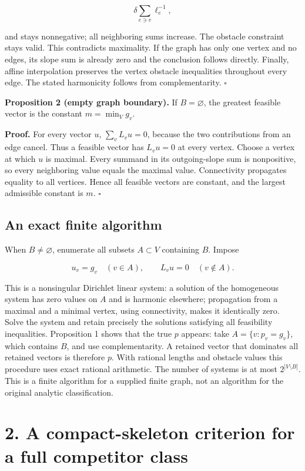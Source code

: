 \documentclass[
  11pt,
]{article}
\begin{document}
\[\delta\sum_{e\ni v}\ell_e^{-1},\]

and stays nonnegative; all neighboring sums increase. The obstacle
constraint stays valid. This contradicts maximality. If the graph has
only one vertex and no edges, its slope sum is already zero and the
conclusion follows directly. Finally, affine interpolation preserves the
vertex obstacle inequalities throughout every edge. The stated
harmonicity follows from complementarity. \(\square\)

\textbf{Proposition 2 (empty graph boundary).} If \(B=\varnothing\), the
greatest feasible vector is the constant \(m=\min_Vg_v\).

\textbf{Proof.} For every vector \(u\), \(\sum_vL_vu=0\), because the
two contributions from an edge cancel. Thus a feasible vector has
\(L_vu=0\) at every vertex. Choose a vertex at which \(u\) is maximal.
Every summand in its outgoing-slope sum is nonpositive, so every
neighboring value equals the maximal value. Connectivity propagates
equality to all vertices. Hence all feasible vectors are constant, and
the largest admissible constant is \(m\). \(\square\)

\subsection{An exact finite algorithm}\label{an-exact-finite-algorithm}

When \(B\ne\varnothing\), enumerate all subsets \(A\subset V\)
containing \(B\). Impose

\[u_v=g_v\quad(v\in A),\qquad L_vu=0\quad(v\notin A).\]

This is a nonsingular Dirichlet linear system: a solution of the
homogeneous system has zero values on \(A\) and is harmonic elsewhere;
propagation from a maximal and a minimal vertex, using connectivity,
makes it identically zero. Solve the system and retain precisely the
solutions satisfying all feasibility inequalities. Proposition 1 shows
that the true \(p\) appears: take \(A=\{v:p_v=g_v\}\), which contains
\(B\), and use complementarity. A retained vector that dominates all
retained vectors is therefore \(p\). With rational lengths and obstacle
values this procedure uses exact rational arithmetic. The number of
systems is at most \(2^{|V\setminus B|}\). This is a finite algorithm
for a supplied finite graph, not an algorithm for the original analytic
classification.

\section{2. A compact-skeleton criterion for a full competitor
class}\label{a-compact-skeleton-criterion-for-a-full-competitor-class}
\end{document}
